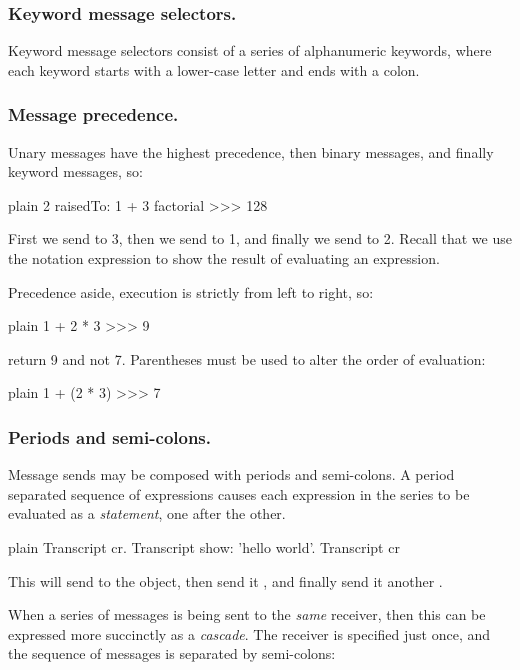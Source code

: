 \documentclass[10pt,twoside,english]{_support/latex/sbabook/sbabook}
\begin{document}
\subsubsection{Keyword message selectors.}
Keyword message selectors consist of a series of alphanumeric keywords, where
each keyword starts with a lower-case letter and ends with a colon.
\subsubsection{Message precedence.}
Unary messages have the highest precedence, then binary messages, and finally
keyword messages, so:

\begin{displaycode}{plain}
2 raisedTo: 1 + 3 factorial
>>> 128
\end{displaycode}

First we send  to 3, then we send  to 1, and finally we
send  to 2. Recall that we use the notation expression \textcode{--\textgreater{}}
to show the result of evaluating an expression.

Precedence aside, execution is strictly from left to right, so:

\begin{displaycode}{plain}
1 + 2 * 3 
>>> 9
\end{displaycode}

return 9 and not 7. Parentheses must be used to alter the order of evaluation:

\begin{displaycode}{plain}
1 + (2 * 3) 
>>> 7
\end{displaycode}
\subsubsection{Periods and semi-colons.}
Message sends may be composed with periods and semi-colons. A period separated
sequence of expressions causes each expression in the series to be evaluated as
a \textit{statement}, one after the other.

\begin{displaycode}{plain}
Transcript cr.
Transcript show: 'hello world'.
Transcript cr
\end{displaycode}

This will send  to the  object, then send it , and finally send it another .

When a series of messages is being sent to the \textit{same} receiver, then this can
be expressed more succinctly as a \textit{cascade}. The receiver is specified just
once, and the sequence of messages is separated by semi-colons:
\end{document}
